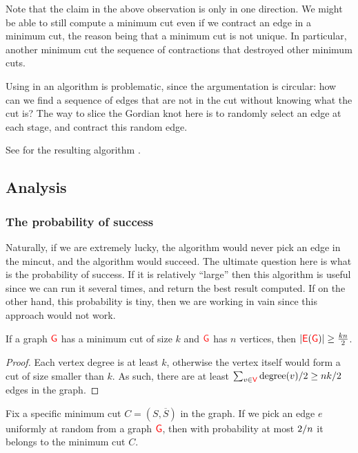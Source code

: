 Note that the claim in the above observation is only in one
direction. We might be able to still compute a minimum cut even if we
contract an edge in a minimum cut, the reason being that a minimum cut
is not unique. In particular, another minimum cut  the
sequence of contractions that destroyed other minimum cuts.


Using  in an algorithm is problematic, since the
argumentation is circular: how can we find a sequence of edges that
are not in the cut without knowing what the cut is?  The way to slice
the Gordian knot here is to randomly select an edge at each stage,
and contract this random edge.


See  for the resulting algorithm \MinCut{}.


\subsection{Analysis}

\subsubsection{The probability of success}
Naturally, if we are extremely lucky, the algorithm would never pick
an edge in the mincut, and the algorithm would succeed. The ultimate
question here is what is the probability of success. If it is
relatively ``large'' then this algorithm is useful since we can run it
several times, and return the best result computed. If on the other
hand, this probability is tiny, then we are working in vain since this
approach would not work.

\begin{lemma}
    If a graph ${\textcolor{red}{\mathsf{G}}}$ has a minimum cut of size $k$ and ${\textcolor{red}{\mathsf{G}}}$ has
    $n$ vertices, then $|{\textcolor{red}{\mathsf{E}}}({\textcolor{red}{\mathsf{G}}})|\geq\frac{kn}{2}$.
\end{lemma}

\begin{proof}
    Each vertex degree is at least $k$, otherwise the vertex itself
    would form a cut of size smaller than $k$. As such, there
    are at least $\sum_{v \in \Vertices} \degreeX{v} / 2 \geq n
    k /2$ edges in the graph.
\end{proof}

\begin{lemma}
    Fix a specific minimum cut $C = (S,\overline{S})$ in the graph.
    If we pick an edge $e$ uniformly at random from a graph ${\textcolor{red}{\mathsf{G}}}$, then with probability at most ${2}/{n}$ it belongs
    to the minimum cut $C$.
\end{lemma}

